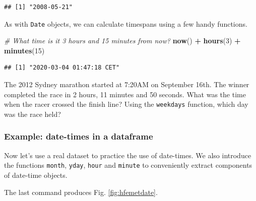 \documentclass[]{book}
\newenvironment{Shaded}{\begin{snugshade}}{\end{snugshade}}
\newcommand{\CommentTok}[1]{\textcolor[rgb]{0.56,0.35,0.01}{\textit{#1}}}
\newcommand{\DecValTok}[1]{\textcolor[rgb]{0.00,0.00,0.81}{#1}}
\newcommand{\KeywordTok}[1]{\textcolor[rgb]{0.13,0.29,0.53}{\textbf{#1}}}
\newcommand{\NormalTok}[1]{#1}
\newcommand{\OperatorTok}[1]{\textcolor[rgb]{0.81,0.36,0.00}{\textbf{#1}}}
\newcommand{\StringTok}[1]{\textcolor[rgb]{0.31,0.60,0.02}{#1}}
\let\BeginKnitrBlock\begin \let\EndKnitrBlock\end
\begin{document}
\begin{verbatim}
## [1] "2008-05-21"
\end{verbatim}

As with \texttt{Date} objects, we can calculate timespans using a few handy functions.

\begin{Shaded}
\begin{Highlighting}[]
\CommentTok{# What time is it 3 hours and 15 minutes from now?}
\KeywordTok{now}\NormalTok{() }\OperatorTok{+}\StringTok{ }\KeywordTok{hours}\NormalTok{(}\DecValTok{3}\NormalTok{) }\OperatorTok{+}\StringTok{ }\KeywordTok{minutes}\NormalTok{(}\DecValTok{15}\NormalTok{)}
\end{Highlighting}
\end{Shaded}

\begin{verbatim}
## [1] "2020-03-04 01:47:18 CET"
\end{verbatim}

\BeginKnitrBlock{rmdtry}
The 2012 Sydney marathon started at 7:20AM on September 16th. The winner completed the race in 2 hours, 11 minutes and 50 seconds. What was the time when the racer crossed the finish line? Using the \texttt{weekdays} function, which day was the race held?
\EndKnitrBlock{rmdtry}

\hypertarget{example-date-times-in-a-dataframe}{%
\subsubsection{Example: date-times in a dataframe}\label{example-date-times-in-a-dataframe}}

Now let's use a real dataset to practice the use of date-times. We also introduce the functions \texttt{month}, \texttt{yday}, \texttt{hour} and \texttt{minute} to conveniently extract components of date-time objects.

The last command produces Fig. \ref{fig:hfemetdate}.
\end{document}
